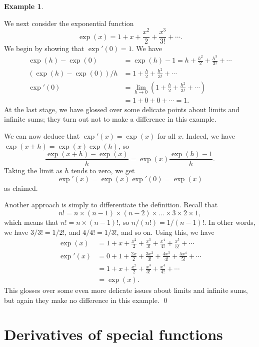 \documentclass[a4paper]{book}
\newcommand{\tm}        {\times}
\newcommand{\xra}       {\xrightarrow}
\renewcommand{\:}{\colon}
\newcommand{\bilabel}[1]{\hypertarget{#1}{\label{#1}}}
\theoremstyle{definition}
\newtheorem{example}[theorem]{Example}
\begin{document}
\begin{example}\bilabel{eg-diff-exp}
 We next consider the exponential function
 \[ \exp(x) = 1 + x + \frac{x^2}{2} + \frac{x^3}{3!} + \cdots. \]
 We begin by showing that $\exp'(0)=1$.  We have
 \begin{align*}
  \exp(h) - \exp(0) &= \exp(h) - 1 =
   h + \frac{h^2}{2} + \frac{h^3}{3!} + \cdots \\
  (\exp(h)-\exp(0))/h &= 
   1 + \frac{h}{2} + \frac{h^2}{3!} + \cdots \\
  \exp'(0) &=
   \lim_{h\xra{}0}(1 + \frac{h}{2} + \frac{h^2}{3!} + \cdots) \\
    &= 1 + 0 + 0 + \cdots = 1.
 \end{align*}
 At the last stage, we have glossed over some delicate points about
 limits and infinite sums; they turn out not to make a difference in
 this example.  

 We can now deduce that $\exp'(x)=\exp(x)$ for all $x$.  Indeed, we
 have $\exp(x+h)=\exp(x)\exp(h)$, so 
 \[ \frac{\exp(x+h)-\exp(x)}{h} = \exp(x) \frac{\exp(h)-1}{h}. \]
 Taking the limit as $h$ tends to zero, we get
 \[ \exp'(x) = \exp(x)\exp'(0) = \exp(x) \]
 as claimed.

 Another approach is simply to differentiate the definition.  Recall
 that 
 \[ n! = n\tm(n-1)\tm(n-2)\tm\ldots\tm 3\tm 2\tm 1, \]
 which means that $n!=n\tm (n-1)!$, so $n/(n!)=1/(n-1)!$.  In other
 words, we have $3/3!=1/2!$, and $4/4!=1/3!$, and so on.  Using this,
 we have
 \begin{align*}
  \exp(x)  &= 1 + x + \frac{x^2}{2} + \frac{x^3}{3!} + 
              \frac{x^4}{4!} + \frac{x^5}{5!} + \cdots \\
  \exp'(x) &= 0 + 1 + \frac{2x}{2} + \frac{3x^2}{3!} + 
              \frac{4x^3}{4!} + \frac{5x^4}{5!} + \cdots \\
           &= 1 + x + \frac{x^2}{2} + \frac{x^3}{3!} + 
              \frac{x^4}{4!} + \cdots \\
           &= \exp(x).
 \end{align*}
 This glosses over some even more delicate issues about limits and
 infinite sums, but again they make no difference in this example. \qed
\end{example}

\section{Derivatives of special functions}
\label{sec-diff-spec}
\end{document}
